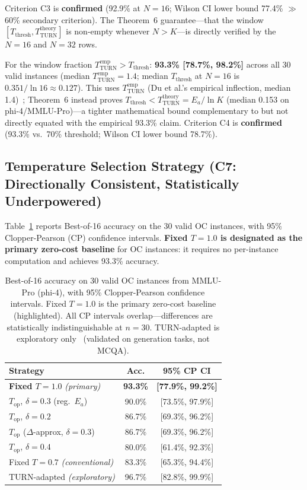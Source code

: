 \documentclass[11pt,letterpaper,twocolumn]{article}
\begin{document}
Criterion C3 is \textbf{confirmed} (92.9\% at $N=16$; Wilson CI lower bound 77.4\% $\gg$
60\% secondary criterion). The Theorem~6 guarantee---that the window $[T_\text{thresh},
T_\text{TURN}^\text{theory}]$ is non-empty whenever $N > K$---is directly verified by the
$N=16$ and $N=32$ rows.

For the window fraction $T_\text{TURN}^\text{emp} > T_\text{thresh}$: \textbf{93.3\%
[78.7\%, 98.2\%]} across all 30 valid instances (median $T_\text{TURN}^\text{emp} = 1.4$;
median $T_\text{thresh}$ at $N=16$ is $0.351/\ln 16 \approx 0.127$). This uses
$T_\text{TURN}^\text{emp}$ (Du et al.'s empirical inflection, median 1.4)~\cite{Du2025};
Theorem~6 instead proves $T_\text{thresh} < T_\text{TURN}^\text{theory} = E_a/\ln K$
(median 0.153 on phi-4/MMLU-Pro)---a tighter mathematical bound complementary to but not
directly equated with the empirical 93.3\% claim. Criterion C4 is \textbf{confirmed}
(93.3\% vs.\ 70\% threshold; Wilson CI lower bound 78.7\%).

\subsection{Temperature Selection Strategy (C7: Directionally Consistent, Statistically Underpowered)}

Table~\ref{tab:accuracy} reports Best-of-16 accuracy on the 30 valid OC instances, with
95\% Clopper-Pearson (CP) confidence intervals. \textbf{Fixed $T=1.0$ is designated as
the primary zero-cost baseline} for OC instances: it requires no per-instance computation
and achieves 93.3\% accuracy.

\begin{table}[!htbp]
\centering
\caption{Best-of-16 accuracy on 30 valid OC instances from MMLU-Pro (phi-4), with 95\%
Clopper-Pearson confidence intervals. Fixed $T=1.0$ is the primary zero-cost baseline
(highlighted). All CP intervals overlap---differences are statistically indistinguishable
at $n=30$. TURN-adapted is exploratory only~\cite{Du2025} (validated on generation tasks,
not MCQA).}
\label{tab:accuracy}
\small
\begin{tabular}{lcc}
\hline
Strategy & Acc. & 95\% CP CI \\
\hline
\textbf{Fixed $T = 1.0$} \emph{(primary)} & \textbf{93.3\%} & \textbf{[77.9\%, 99.2\%]} \\
$T_\text{op}$, $\delta=0.3$ (reg.\ $E_a$)  & 90.0\% & [73.5\%, 97.9\%] \\
$T_\text{op}$, $\delta=0.2$               & 86.7\% & [69.3\%, 96.2\%] \\
$T_\text{op}$ ($\Delta$-approx, $\delta=0.3$) & 86.7\% & [69.3\%, 96.2\%] \\
$T_\text{op}$, $\delta=0.4$               & 80.0\% & [61.4\%, 92.3\%] \\
Fixed $T = 0.7$ \emph{(conventional)}     & 83.3\% & [65.3\%, 94.4\%] \\
\hline\hline
TURN-adapted \emph{(exploratory)}         & 96.7\% & [82.8\%, 99.9\%] \\
\hline
\end{tabular}
\end{table}
\end{document}
